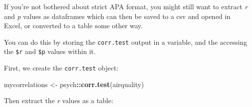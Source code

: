 \documentclass[]{article}
\newenvironment{Shaded}{\begin{snugshade}}{\end{snugshade}}
\newcommand{\KeywordTok}[1]{\textcolor[rgb]{0.13,0.29,0.53}{\textbf{#1}}}
\newcommand{\StringTok}[1]{\textcolor[rgb]{0.31,0.60,0.02}{#1}}
\newcommand{\OperatorTok}[1]{\textcolor[rgb]{0.81,0.36,0.00}{\textbf{#1}}}
\newcommand{\NormalTok}[1]{#1}
\theoremstyle{definition}
\theoremstyle{definition}
\theoremstyle{definition}
\theoremstyle{remark}
\begin{document}
If you're not bothered about strict APA format, you might still want to
extract \emph{r} and \emph{p} values as dataframes which can then be
saved to a csv and opened in Excel, or converted to a table some other
way.

You can do this by storing the \texttt{corr.test} output in a variable,
and the accessing the \texttt{\$r} and \texttt{\$p} values within it.

First, we create the \texttt{corr.test} object:

\begin{Shaded}
\begin{Highlighting}[]
\NormalTok{mycorrelations <-}\StringTok{ }\NormalTok{psych}\OperatorTok{::}\KeywordTok{corr.test}\NormalTok{(airquality)}
\end{Highlighting}
\end{Shaded}

Then extract the \emph{r} values as a table:

\begin{Shaded}
\end{Shaded}
\end{document}
